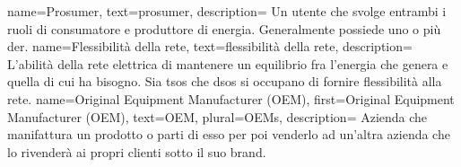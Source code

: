 {
    name={Prosumer},
    text={prosumer},
    description={
            Un utente che svolge entrambi i ruoli di consumatore e produttore di energia. Generalmente possiede uno o più \gls{der}.
        }
}
{
    name={Flessibilità della rete},
    text={flessibilità della rete},
    description={
            L'abilità della rete elettrica di mantenere un equilibrio fra l'energia che genera e quella di cui ha bisogno.
            Sia \glspl{tso} che \glspl{dso} si occupano di fornire flessibilità alla rete.
        }
}
{
    name={Original Equipment Manufacturer (OEM)},
    first={Original Equipment Manufacturer (OEM)},
    text={OEM},
    plural={OEMs},
    description={
            Azienda che manifattura un prodotto o parti di esso per poi venderlo ad un'altra azienda che lo rivenderà ai propri clienti sotto il suo brand.
        }
}